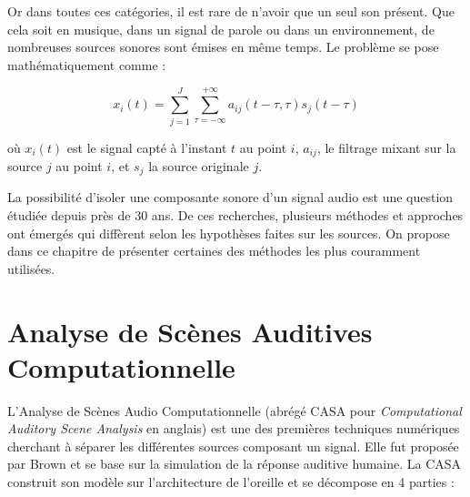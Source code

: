 Or dans toutes ces catégories, il est rare de n'avoir que un seul son présent. Que cela soit en musique, dans un signal de parole ou dans un environnement, de nombreuses sources sonores sont émises en même temps. Le problème se pose mathématiquement comme : 

\begin{equation}
x_i(t) = \sum_{j = 1}^{J}\sum_{\tau = -\infty}^{+\infty} a_{ij}(t-\tau,\tau)s_j(t-\tau)
\end{equation}

où $x_i(t)$ est le signal capté à l'instant $t$ au point $i$, $a_{ij}$, le filtrage mixant sur la source $j$ au point $i$, et $s_{j}$ la source originale $j$.

La possibilité d'isoler une composante sonore d'un signal audio est une question étudiée depuis près de 30 ans. De ces recherches, plusieurs méthodes et approches ont émergés qui diffèrent selon les hypothèses faites sur les sources. On propose dans ce chapitre de présenter certaines des méthodes les plus couramment utilisées. 

\section{Analyse de Scènes Auditives Computationnelle}
L'Analyse de Scènes Audio Computationnelle (abrégé CASA pour \textit{Computational Auditory Scene Analysis} en anglais) est une des premières techniques numériques cherchant à séparer les différentes sources composant un signal. Elle fut proposée par Brown \cite{brown1994computational} et se base sur la simulation de la réponse auditive humaine.
La CASA construit son modèle sur l'architecture de l'oreille et se décompose en 4 parties \cite{wang2006computational} : 


